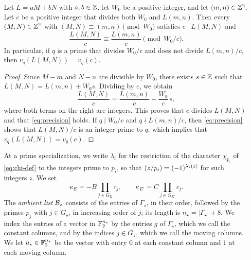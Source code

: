 \begin{lemma}\label{lem:precision}
Let $L=aM+bN$ with $a,b\in\mathbb Z$, let $W_0$ be a positive integer, and let $(m,n)\in\mathbb Z^2$. Let $c$ be a positive integer that divides both $W_0$ and $L(m,n)$. Then every $(M,N)\in\mathbb Z^2$ with $(M,N)\equiv(m,n)\pmod{W_0}$ satisfies $c\mid L(M,N)$ and
\begin{equation}\label{eq:precision}
\frac{L(M,N)}c\equiv\frac{L(m,n)}c\pmod{W_0/c}.
\end{equation}
In particular, if $q$ is a prime that divides $W_0/c$ and does not divide $L(m,n)/c$, then $v_q(L(M,N))=v_q(c)$.
\end{lemma}

\begin{proof}
Since $M-m$ and $N-n$ are divisible by $W_0$, there exists $s\in\mathbb Z$ such that $L(M,N)=L(m,n)+W_0s$. Dividing by $c$, we obtain
\begin{equation}
\frac{L(M,N)}c=\frac{L(m,n)}c+\frac{W_0}c\,s,
\end{equation}
where both terms on the right are integers. This proves that $c$ divides $L(M,N)$ and that \eqref{eq:precision} holds. If $q\mid W_0/c$ and $q\nmid L(m,n)/c$, then \eqref{eq:precision} shows that $L(M,N)/c$ is an integer prime to $q$, which implies that $v_q(L(M,N))=v_q(c)$.
\end{proof}

At a prime specialization, we write $\lambda_i$ for the restriction of the character $\chi_{p_i}$ of \eqref{eq:chi-def} to the integers prime to $p_i$, so that $\leg z{p_i}=(-1)^{\lambda_i(z)}$ for such integers $z$. We set
\begin{equation}\label{eq:kappa}
\kappa_E=-B\prod_{j\in G_E}c_j,\qquad\kappa_{E'}=C\prod_{j\in G_{E'}}c_j.
\end{equation}
The \emph{ambient list} $\mathcal B_\star$ consists of the entries of $\Gamma_\star$, in their order, followed by the primes $p_j$ with $j\in G_\star$, in increasing order of $j$; its length is $n_\star=|\Gamma_\star|+8$. We index the entries of a vector in $\mathbb F_2^{n_\star}$ by the entries $g$ of $\Gamma_\star$, which we call the constant columns, and by the indices $j\in G_\star$, which we call the moving columns. We let $u_\star\in\mathbb F_2^{n_\star}$ be the vector with entry $0$ at each constant column and $1$ at each moving column.

